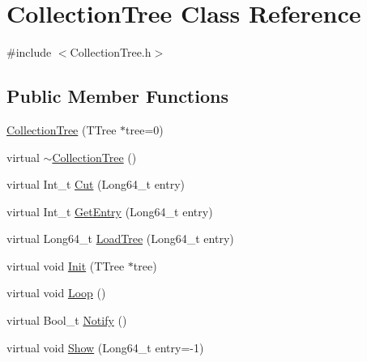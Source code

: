 \hypertarget{classCollectionTree}{}\section{Collection\+Tree Class Reference}
\label{classCollectionTree}


{\ttfamily \#include $<$Collection\+Tree.\+h$>$}

\subsection*{Public Member Functions}
\begin{DoxyCompactItemize}
\item 
\hyperlink{classCollectionTree_a614ba639ccf5a5a8f5c5565eb62e68e2}{Collection\+Tree} (T\+Tree $\ast$tree=0)
\item 
virtual \hyperlink{classCollectionTree_a4b340d122a47ad23bb1ae22b5e39bffe}{$\sim$\+Collection\+Tree} ()
\item 
virtual Int\+\_\+t \hyperlink{classCollectionTree_afb6394452eb4e603f983b8dd6b52d626}{Cut} (Long64\+\_\+t entry)
\item 
virtual Int\+\_\+t \hyperlink{classCollectionTree_aadc39689f0ba85ec26ea4075685892ce}{Get\+Entry} (Long64\+\_\+t entry)
\item 
virtual Long64\+\_\+t \hyperlink{classCollectionTree_ad1078cb9a72a2fd608b5fd68ac6df2ec}{Load\+Tree} (Long64\+\_\+t entry)
\item 
virtual void \hyperlink{classCollectionTree_aed8308b47a1f249d6f1d385d535e2edf}{Init} (T\+Tree $\ast$tree)
\item 
virtual void \hyperlink{classCollectionTree_a5f5c3a98413437300f96c69a88cfda37}{Loop} ()
\item 
virtual Bool\+\_\+t \hyperlink{classCollectionTree_a5e193a0aa40f9d4ca7e02c1b8666a3ca}{Notify} ()
\item 
virtual void \hyperlink{classCollectionTree_a0006b80637c3146440301613c7318267}{Show} (Long64\+\_\+t entry=-\/1)
\end{DoxyCompactItemize}
